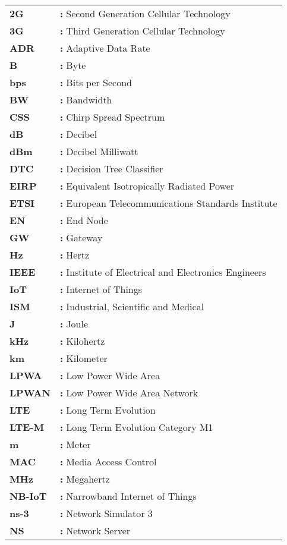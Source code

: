 \hspace{-3mm}
\begin{tabular}{p{2cm}l}
{\bf 2G} & {\bf:} Second Generation Cellular Technology\\
{\bf 3G} & {\bf:} Third Generation Cellular Technology\\
{\bf ADR} & {\bf:} Adaptive Data Rate\\
{\bf B} & {\bf:} Byte\\
{\bf bps} & {\bf:} Bits per Second\\
{\bf BW} & {\bf:} Bandwidth\\
{\bf CSS} & {\bf:} Chirp Spread Spectrum\\
{\bf dB} & {\bf:} Decibel\\
{\bf dBm} & {\bf:} Decibel Milliwatt\\
{\bf DTC} & {\bf:} Decision Tree Classifier\\
{\bf EIRP} & {\bf:} Equivalent Isotropically Radiated Power\\
{\bf ETSI} & {\bf:} European Telecommunications Standards Institute\\
{\bf EN} & {\bf:} End Node\\
{\bf GW} & {\bf:} Gateway\\
{\bf Hz} & {\bf:} Hertz\\
{\bf IEEE} & {\bf:} Institute of Electrical and Electronics Engineers\\
{\bf IoT} & {\bf:} Internet of Things\\
{\bf ISM} & {\bf:} Industrial, Scientific and Medical\\
{\bf J} & {\bf:} Joule\\
{\bf kHz} & {\bf:} Kilohertz\\
{\bf km} & {\bf:} Kilometer\\
{\bf LPWA} & {\bf:} Low Power Wide Area\\
{\bf LPWAN} & {\bf:} Low Power Wide Area Network\\
{\bf LTE} & {\bf:} Long Term Evolution\\
{\bf LTE-M} & {\bf:}  Long Term Evolution Category M1\\
{\bf m} & {\bf:} Meter\\
{\bf MAC} & {\bf:} Media Access Control\\
{\bf MHz} & {\bf:} Megahertz\\
{\bf NB-IoT} & {\bf:} Narrowband Internet of Things\\
{\bf ns-3} & {\bf:} Network Simulator 3\\
{\bf NS} & {\bf:} Network Server\\

\end{tabular}

